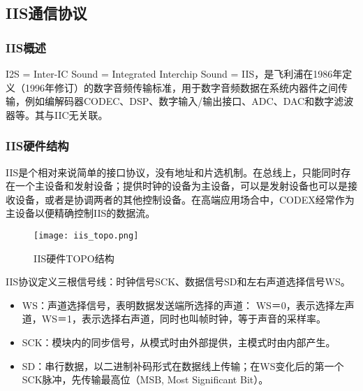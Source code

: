 \subsection{IIS通信协议}
\subsubsection{IIS概述}
I2S = Inter-IC Sound = Integrated Interchip Sound = IIS，是飞利浦在1986年定义（1996年修订）的数字音频传输标准，用于数字音频数据在系统内器件之间传输，例如编解码器CODEC、DSP、数字输入/输出接口、ADC、DAC和数字滤波器等。其与IIC无关联。

\subsubsection{IIS硬件结构}
IIS是个相对来说简单的接口协议，没有地址和片选机制。在总线上，只能同时存在一个主设备和发射设备；提供时钟的设备为主设备，可以是发射设备也可以是接收设备，或者是协调两者的其他控制设备。在高端应用场合中，CODEX经常作为主设备以便精确控制IIS的数据流。

\begin{figure}[H]
\centering
\texttt{[image: iis\_topo.png]}
\caption{IIS硬件TOPO结构}
\end{figure}

IIS协议定义三根信号线：时钟信号SCK、数据信号SD和左右声道选择信号WS。
\begin{itemize}
\item WS：声道选择信号，表明数据发送端所选择的声道： WS＝0，表示选择左声道，WS＝1，表示选择右声道，同时也叫帧时钟，等于声音的采样率。
\item SCK：模块内的同步信号，从模式时由外部提供，主模式时由内部产生。
\item SD：串行数据，以二进制补码形式在数据线上传输；在WS变化后的第一个SCK脉冲，先传输最高位（MSB, Most Significant Bit）。
\end{itemize}

